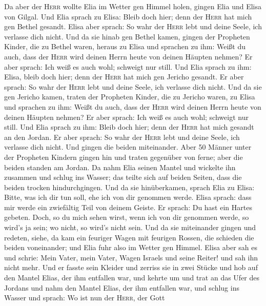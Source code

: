  Da aber der \textsc{Herr} wollte Elia im Wetter gen
Himmel holen, gingen Elia und Elisa von Gilgal.  Und Elia
sprach zu Elisa: Bleib doch hier; denn der \textsc{Herr} hat mich gen
Bethel gesandt. Elisa aber sprach: So wahr der \textsc{Herr} lebt und
deine Seele, ich verlasse dich nicht. Und da sie hinab gen Bethel kamen,
 gingen der Propheten Kinder, die zu Bethel waren, heraus
zu Elisa und sprachen zu ihm: Weißt du auch, dass der \textsc{Herr} wird
deinen Herrn heute von deinen Häupten nehmen? Er aber sprach: Ich weiß
es auch wohl; schweigt nur still.  Und Elia sprach zu ihm:
Elisa, bleib doch hier; denn der \textsc{Herr} hat mich gen Jericho
gesandt. Er aber sprach: So wahr der \textsc{Herr} lebt und deine Seele,
ich verlasse dich nicht. Und da sie gen Jericho kamen, 
traten der Propheten Kinder, die zu Jericho waren, zu Elisa und sprachen
zu ihm: Weißt du auch, dass der \textsc{Herr} wird deinen Herrn heute
von deinen Häupten nehmen? Er aber sprach: Ich weiß es auch wohl;
schweigt nur still.  Und Elia sprach zu ihm: Bleib doch
hier; denn der \textsc{Herr} hat mich gesandt an den Jordan. Er aber
sprach: So wahr der \textsc{Herr} lebt und deine Seele, ich verlasse
dich nicht. Und gingen die beiden miteinander.  Aber 50
Männer unter der Propheten Kindern gingen hin und traten gegenüber von
ferne; aber die beiden standen am Jordan.  Da nahm Elia
seinen Mantel und wickelte ihn zusammen und schlug ins Wasser; das
teilte sich auf beiden Seiten, dass die beiden trocken hindurchgingen.
 Und da sie hinüberkamen, sprach Elia zu Elisa: Bitte, was
ich dir tun soll, ehe ich von dir genommen werde. Elisa sprach: dass mir
werde ein zwiefältig Teil von deinem Geiste.  Er sprach:
Du hast ein Hartes gebeten. Doch, so du mich sehen wirst, wenn ich von
dir genommen werde, so wird's ja sein; wo nicht, so wird's nicht sein.
 Und da sie miteinander gingen und redeten, siehe, da kam
ein feuriger Wagen mit feurigen Rossen, die schieden die beiden
voneinander; und Elia fuhr also im Wetter gen Himmel. 
Elisa aber sah es und schrie: Mein Vater, mein Vater, Wagen Israels und
seine Reiter! und sah ihn nicht mehr. Und er fasste sein Kleider und
zerriss sie in zwei Stücke  und hob auf den Mantel Elias,
der ihm entfallen war, und kehrte um und trat an das Ufer des Jordans
 und nahm den Mantel Elias, der ihm entfallen war, und
schlug ins Wasser und sprach: Wo ist nun der \textsc{Herr}, der Gott
